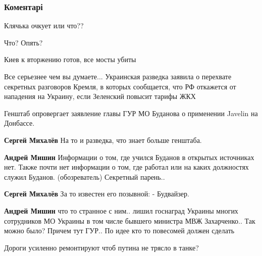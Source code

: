  
 
 
 
 
\subsubsection{Коментарі}

\begin{itemize} %
Клячька очкует или что??

Что? Опять?

Киев к вторжению готов, все мосты убиты


Все серьезнее чем вы думаете... Украинская разведка заявила о перехвате
секретных разговоров Кремля, в которых сообщается, что РФ откажется от
нападения на Украину, если Зеленский повысит тарифы ЖКХ


Генштаб опровергает заявление главы ГУР МО Буданова о применении Javelin на
Донбассе.

\begin{itemize} %
\textbf{Сергей Михалёв} На то и разведка, что знает больше генштаба.

\textbf{Андрей Мишин} Информации о том, где учился Буданов в открытых источниках нет. Также почти нет информации о том, где работал или на каких должностях служил Буданов. (обозреватель) Секретный парень..


\textbf{Сергей Михалёв} За то известен его позывной: - Будвайзер.

\textbf{Андрей Мишин} что то странное с ним.. лишил госнаград Украины многих сотрудников МО Украины в том числе бывшего министра МВЖ Захарченко.. Так можно было? Причем тут ГУР.. По идее кто то повесомей должен сделать

\end{itemize} %


Дороги усиленно ремонтируют чтоб путина не трясло в танке?

\end{itemize} %
